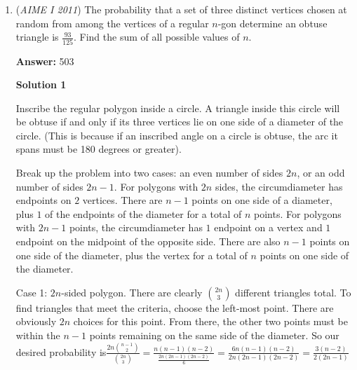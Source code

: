 \begin{enumerate}
 \textbf{Second way:} Multiplying our old equation $24\sin ^3 x=\cos ^2 x$ by $\dfrac{24}{\sin^2x}$ gives 
 \[576\sin x = 24\cot^2x\]So, $24\cot^2x=576\sin x=576\cdot\frac{1}{3}=\boxed{192}$.

 



\textbf{Solution 2}

Like Solution 1, we can rewrite the given expression as
 \[24\sin^3x=\cos^2x\]Divide both sides by $\sin^3x$.
 \[24 = \cot^2x\csc x\]Square both sides.
 \[576 = \cot^4x\csc^2x\]Substitute the identity $\csc^2x = \cot^2x + 1$.
 \[576 = \cot^4x(\cot^2x + 1)\]Let $a = \cot^2x$. Then
 \[576 = a^3 + a^2\].Since $\sqrt[3]{576} \approx 8$, we can easily see that $a = 8$ is a solution. Thus, the answer is $24\cot^2x = 24a = 24 \cdot 8 = \boxed{192}$.

 


	\item (\textit{AIME I 2011}) The probability that a set of three distinct vertices chosen at random from among the vertices of a regular $n$-gon determine an obtuse triangle is $\frac{93}{125}$.  Find the sum of all possible values of $n$.


 
 \textbf{Answer: }503



\textbf{Solution 1}

Inscribe the regular polygon inside a circle. A triangle inside this circle will be obtuse if and only if its three vertices lie on one side of a diameter of the circle. (This is because if an inscribed angle on a circle is obtuse, the arc it spans must be 180 degrees or greater).

 Break up the problem into two cases: an even number of sides $2n$, or an odd number of sides $2n-1$. For polygons with $2n$ sides, the circumdiameter has endpoints on $2$ vertices. There are $n-1$ points on one side of a diameter, plus $1$ of the endpoints of the diameter for a total of $n$ points. For polygons with $2n - 1$ points, the circumdiameter has $1$ endpoint on a vertex and $1$ endpoint on the midpoint of the opposite side. There are also $n - 1$ points on one side of the diameter, plus the vertex for a total of $n$ points on one side of the diameter.

 Case 1: $2n$-sided polygon. There are clearly $\binom{2n}{3}$ different triangles total. To find triangles that meet the criteria, choose the left-most point. There are obviously $2n$ choices for this point. From there, the other two points must be within the $n-1$ points remaining on the same side of the diameter. So our desired probability is$\frac{2n\binom{n-1}{2}}{\binom{2n}{3}}$$=\frac{n(n-1)(n-2)}{\frac{2n(2n-1)(2n-2)}{6}}$$=\frac{6n(n-1)(n-2)}{2n(2n-1)(2n-2)}$$=\frac{3(n-2)}{2(2n-1)}$


\end{enumerate}

